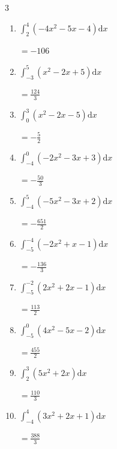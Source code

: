 \begin{multicols}{3}
\begin{enumerate}
        $\displaystyle =\frac{381}{2}$

  \item $\displaystyle \int_{2}^{4}\left( -4x^{2}-5x-4 \right) \mathrm{d}x$

        $\displaystyle =-106$

\columnbreak %

  \item $\displaystyle \int_{-3}^{5}\left( x^{2}-2x+5 \right) \mathrm{d}x$

        $\displaystyle =\frac{124}{3}$

  \item $\displaystyle \int_{0}^{3}\left( x^{2}-2x-5 \right) \mathrm{d}x$

        $\displaystyle =-\frac{5}{2}$

  \item $\displaystyle \int_{-4}^{0}\left( -2x^{2}-3x+3 \right) \mathrm{d}x$

        $\displaystyle =-\frac{50}{3}$

  \item $\displaystyle \int_{-4}^{5}\left( -5x^{2}-3x+2 \right) \mathrm{d}x$

        $\displaystyle =-\frac{651}{2}$

  \item $\displaystyle \int_{-5}^{-4}\left( -2x^{2}+x-1 \right) \mathrm{d}x$

        $\displaystyle =-\frac{136}{3}$

\columnbreak %

\resetques

  \item $\displaystyle \int_{-5}^{-2}\left( 2x^{2}+2x-1 \right) \mathrm{d}x$

        $\displaystyle =\frac{113}{2}$

  \item $\displaystyle \int_{-5}^{0}\left( 4x^{2}-5x-2 \right) \mathrm{d}x$

        $\displaystyle =\frac{455}{2}$

  \item $\displaystyle \int_{2}^{3}\left( 5x^{2}+2x \right) \mathrm{d}x$

        $\displaystyle =\frac{110}{3}$

  \item $\displaystyle \int_{-4}^{4}\left( 3x^{2}+2x+1 \right) \mathrm{d}x$

        $\displaystyle =\frac{388}{3}$


\end{enumerate}
\end{multicols}
